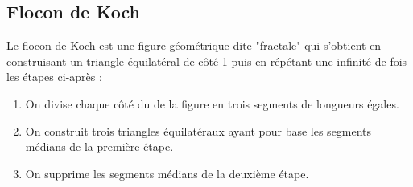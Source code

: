 \documentclass[oneside,12pt]{article}          %
\begin{document}
\subsection{Flocon de Koch}

Le flocon de Koch est une figure géométrique dite "fractale" qui s'obtient en construisant un triangle équilatéral de côté 1 puis en répétant une infinité de fois les étapes ci-après :


\begin{enumerate}
    \item On divise chaque côté du de la figure en trois segments de longueurs égales.
    \item On construit trois triangles équilatéraux ayant pour base les segments médians de la première étape.
    \item On supprime les segments médians de la deuxième étape.
\end{enumerate}
\end{document}
